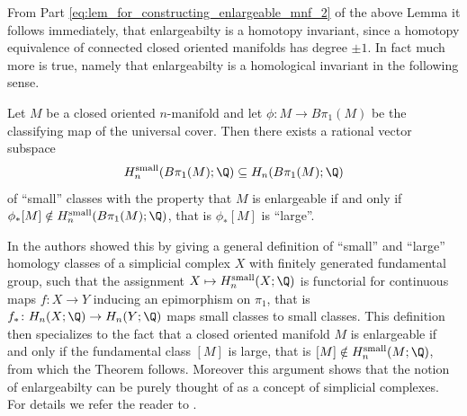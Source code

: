 From Part \ref{eq:lem_for_constructing_enlargeable_mnf_2} of the above Lemma it follows immediately, that enlargeabilty is a homotopy invariant, since a homotopy equivalence of connected closed oriented manifolds has degree $\pm 1$. In fact much more is true, namely that enlargeabilty is a homological invariant in the following sense. 

\begin{theorem}
    Let $M$ be a closed oriented $n$-manifold and let $\phi \colon M \to B\pi_1(M)$ be the classifying map of the universal cover. Then there exists a rational vector subspace 
    \[
    H_n^\mathrm{small}(B\pi_1(M);\Q) \subseteq H_n(B\pi_1(M);\Q)
    \]
    of ``small'' classes with the property that $M$ is enlargeable if and only if $\phi_\ast [M] \notin H_n^\mathrm{small}(B\pi_1(M);\Q)$, that is $\phi_\ast [M]$ is ``large''.
\end{theorem}
 In \cite{BrunnbauerHanke} the authors showed this by giving a general definition of ``small'' and ``large'' homology classes of a simplicial complex $X$ with finitely generated fundamental group, such that the assignment $X \mapsto H_n^\mathrm{small}(X;\Q)$ is functorial for continuous maps $f \colon X \to Y$ inducing an epimorphism on $\pi_1$, that is $f_\ast \colon H_n(X;\Q) \to H_n(Y;\Q)$ maps small classes to small classes. This definition then specializes to the fact that a closed oriented manifold $M$ is enlargeable if and only if the fundamental class $[M]$ is large, that is $[M] \notin H_n^\mathrm{small}(M;\Q)$, from which the Theorem follows. Moreover this argument shows that the notion of enlargeabilty can be purely thought of as a concept of simplicial complexes. For details we refer the reader to \cite{BrunnbauerHanke}.




